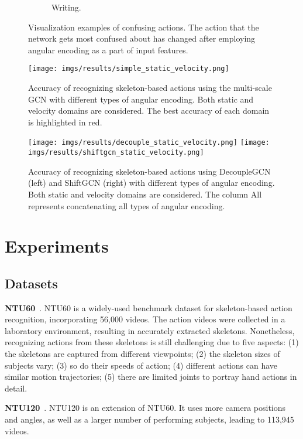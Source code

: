 \documentclass[journal,comsoc]{IEEEtran}
\begin{document}
\begin{figure*}[t]
\begin{subfigure}{.99\textwidth}
  \caption{Writing. }
\end{subfigure}
\caption{
Visualization examples of confusing actions. The action that the network gets most confused about has changed after employing angular encoding as a part of input features. 
}
\label{fig:visual_action_sequence}
\vspace{-2mm}
\end{figure*} \begin{figure}[htbp]
    \centering
    \texttt{[image: imgs/results/simple\_static\_velocity.png]}
    \caption{Accuracy of recognizing skeleton-based actions using the multi-scale GCN with different types of angular encoding. Both static and velocity domains are considered. The best accuracy of each domain is highlighted in red. }
    \label{fig:citation_network_bar_chart}
\end{figure} \begin{figure*}[th]
\centering
\texttt{[image: imgs/results/decouple\_static\_velocity.png]}
\texttt{[image: imgs/results/shiftgcn\_static\_velocity.png]} 
\caption{Accuracy of recognizing skeleton-based actions using DecoupleGCN (left) and ShiftGCN (right) with different types of angular encoding. Both static and velocity domains are considered. 
The column All represents concatenating all types of angular encoding. }
\label{fig:diff_backbone}
\end{figure*} 
\section{Experiments}

\subsection{Datasets} 
\textbf{NTU60}~\cite{shahroudy2016ntu}.
NTU60 is a widely-used benchmark dataset for skeleton-based action recognition, incorporating 56,000 videos. The action videos were collected in a laboratory environment, resulting in accurately extracted skeletons. Nonetheless, recognizing actions from these skeletons is still challenging due to five aspects: (1) the skeletons are captured from different viewpoints; (2) the skeleton sizes of subjects vary; (3) so do their speeds of action; (4) different actions can have similar motion trajectories; (5) there are limited joints to portray hand actions in detail. 

\noindent
\textbf{NTU120}~\cite{liu2019ntu}.
NTU120 is an extension of NTU60. It uses more camera positions and angles, as well as a larger number of performing subjects, leading to 113,945 videos. 
\end{document}
